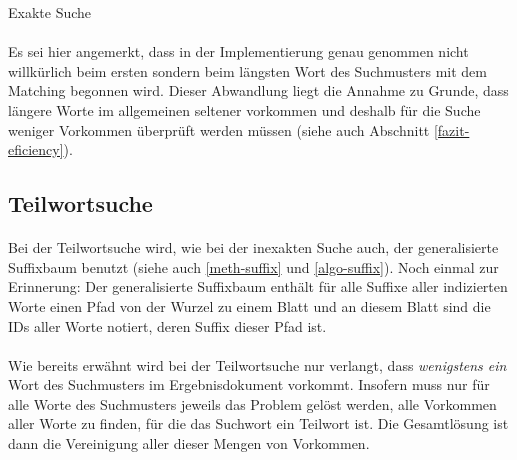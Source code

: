 \begin{algorithm}
\caption{Exakte Suche}
\label{code-exact-search}
\begin{algorithmic}
		\ENDIF
	\ENDFOR
\ENDFOR
\end{algorithmic}
\end{algorithm}

\paragraph{} Es sei hier angemerkt, dass in der Implementierung genau genommen nicht willkürlich beim ersten sondern beim längsten Wort des Suchmusters mit dem Matching begonnen wird. Dieser Abwandlung liegt die Annahme zu Grunde, dass längere Worte im allgemeinen seltener vorkommen und deshalb für die Suche weniger Vorkommen überprüft werden müssen (siehe auch Abschnitt \ref{fazit-eficiency}).

\newpage

\subsection{Teilwortsuche}
\label{algo-substring}

\paragraph{} Bei der Teilwortsuche wird, wie bei der inexakten Suche auch, der generalisierte Suffixbaum benutzt (siehe auch \ref{meth-suffix} und \ref{algo-suffix}). Noch einmal zur Erinnerung: Der generalisierte Suffixbaum enthält für alle Suffixe aller indizierten Worte einen Pfad von der Wurzel zu einem Blatt und an diesem Blatt sind die IDs aller Worte notiert, deren Suffix dieser Pfad ist.
\paragraph{} Wie bereits erwähnt wird bei der Teilwortsuche nur verlangt, dass \textit{wenigstens ein} Wort des Suchmusters im Ergebnisdokument vorkommt. Insofern muss nur für alle Worte des Suchmusters jeweils das Problem gelöst werden, alle Vorkommen aller Worte zu finden, für die das Suchwort ein Teilwort ist. Die Gesamtlösung ist dann die Vereinigung aller dieser Mengen von Vorkommen.
